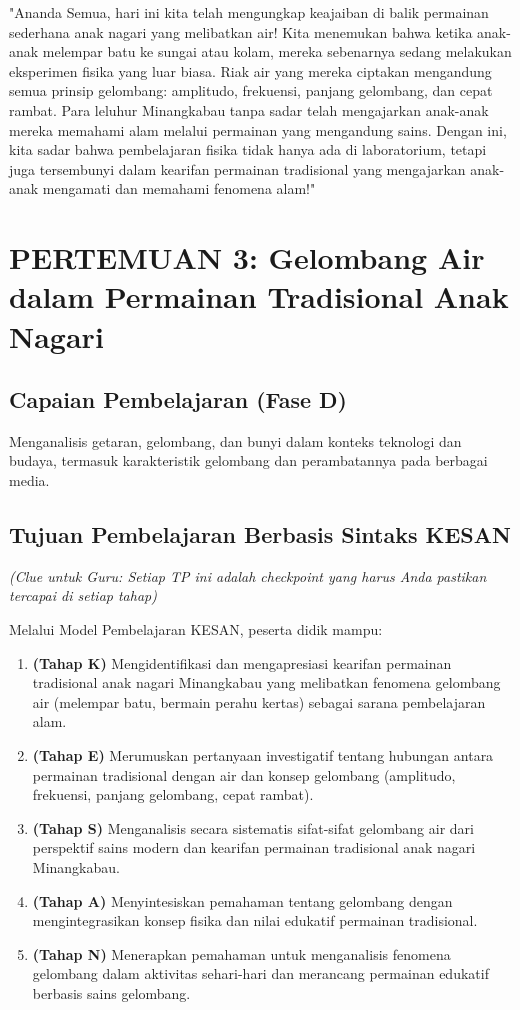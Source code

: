 \documentclass[12pt,a4paper]{article}
\begin{document}
\begin{tcolorbox}[mystyle]
"Ananda Semua, hari ini kita telah mengungkap keajaiban di balik permainan sederhana anak nagari yang melibatkan air! Kita menemukan bahwa ketika anak-anak melempar batu ke sungai atau kolam, mereka sebenarnya sedang melakukan eksperimen fisika yang luar biasa. Riak air yang mereka ciptakan mengandung semua prinsip gelombang: amplitudo, frekuensi, panjang gelombang, dan cepat rambat. Para leluhur Minangkabau tanpa sadar telah mengajarkan anak-anak mereka memahami alam melalui permainan yang mengandung sains. Dengan ini, kita sadar bahwa pembelajaran fisika tidak hanya ada di laboratorium, tetapi juga tersembunyi dalam kearifan permainan tradisional yang mengajarkan anak-anak mengamati dan memahami fenomena alam!"
\end{tcolorbox}

\section{PERTEMUAN 3: Gelombang Air dalam Permainan Tradisional Anak Nagari}

\subsection{Capaian Pembelajaran (Fase D)}
Menganalisis getaran, gelombang, dan bunyi dalam konteks teknologi dan budaya, termasuk karakteristik gelombang dan perambatannya pada berbagai media.

\subsection{Tujuan Pembelajaran Berbasis Sintaks KESAN}
\textit{(Clue untuk Guru: Setiap TP ini adalah checkpoint yang harus Anda pastikan tercapai di setiap tahap)}

Melalui Model Pembelajaran KESAN, peserta didik mampu:

\begin{enumerate}
\item \textbf{(Tahap K)} Mengidentifikasi dan mengapresiasi kearifan permainan tradisional anak nagari Minangkabau yang melibatkan fenomena gelombang air (melempar batu, bermain perahu kertas) sebagai sarana pembelajaran alam.
\item \textbf{(Tahap E)} Merumuskan pertanyaan investigatif tentang hubungan antara permainan tradisional dengan air dan konsep gelombang (amplitudo, frekuensi, panjang gelombang, cepat rambat).
\item \textbf{(Tahap S)} Menganalisis secara sistematis sifat-sifat gelombang air dari perspektif sains modern dan kearifan permainan tradisional anak nagari Minangkabau.
\item \textbf{(Tahap A)} Menyintesiskan pemahaman tentang gelombang dengan mengintegrasikan konsep fisika dan nilai edukatif permainan tradisional.
\item \textbf{(Tahap N)} Menerapkan pemahaman untuk menganalisis fenomena gelombang dalam aktivitas sehari-hari dan merancang permainan edukatif berbasis sains gelombang.
\end{enumerate}
\end{document}
